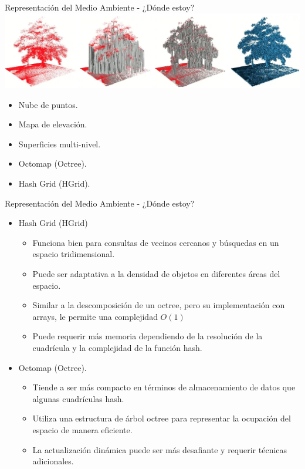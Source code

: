 \documentclass[
  24pt, %
  aspectratio=169, %
]{beamer}
\begin{document}
\begin{frame}{Representación del Medio Ambiente - ¿Dónde estoy?}
  \bigskip %
  \centering
  \includegraphics[width=1\textwidth,height=0.35\textheight]{img4}\footnotemark
  \vspace{2pt}\\
  \bigskip %
  
  \begin{itemize}
  \item Nube de puntos.
  \item Mapa de elevación.
  \item Superficies multi-nivel.
  \item Octomap (Octree).
  \item Hash Grid (HGrid).
  \end{itemize}
  
\end{frame}

\begin{frame}{Representación del Medio Ambiente - ¿Dónde estoy?}

  \begin{itemize}
  \item Hash Grid (HGrid)
    \begin{itemize}
    \item Funciona bien para consultas de vecinos cercanos y búsquedas en un espacio tridimensional.
    \item Puede ser adaptativa a la densidad de objetos en diferentes áreas del espacio.
      \item Similar a la descomposición de un octree, pero su implementación con arrays, le permite una complejidad $O(1)$
    \item Puede requerir más memoria dependiendo de la resolución de la cuadrícula y la complejidad de la función hash.
    \end{itemize}
  \item Octomap (Octree).
    \begin{itemize}
    \item Tiende a ser más compacto en términos de almacenamiento de datos que algunas cuadrículas hash.
    \item Utiliza una estructura de árbol octree para representar la ocupación del espacio de manera eficiente.
    \item La actualización dinámica puede ser más desafiante y requerir técnicas adicionales.
    \end{itemize}
  \end{itemize}  
\end{frame}
\end{document}
